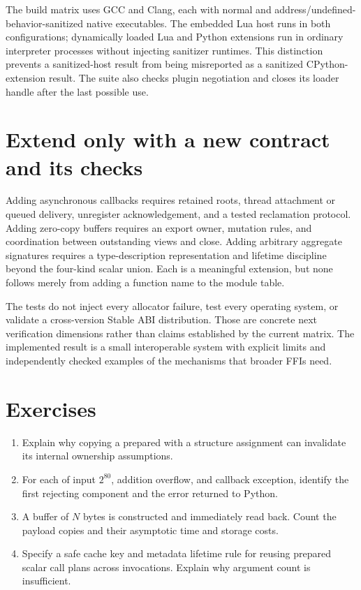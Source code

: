 The build matrix uses GCC and Clang, each with normal and address/undefined-behavior-sanitized native executables.
The embedded Lua host runs in both configurations; dynamically loaded Lua and Python extensions run in ordinary interpreter processes without injecting sanitizer runtimes.
This distinction prevents a sanitized-host result from being misreported as a sanitized CPython-extension result.
The suite also checks plugin negotiation and closes its loader handle after the last possible use.

\section{Extend only with a new contract and its checks}
\label{sec:ch76-extension}
Adding asynchronous callbacks requires retained roots, thread attachment or queued delivery, unregister acknowledgement, and a tested reclamation protocol.
Adding zero-copy buffers requires an export owner, mutation rules, and coordination between outstanding views and close.
Adding arbitrary aggregate signatures requires a type-description representation and lifetime discipline beyond the four-kind scalar union.
Each is a meaningful extension, but none follows merely from adding a function name to the module table.

The tests do not inject every allocator failure, test every operating system, or validate a cross-version Stable ABI distribution.
Those are concrete next verification dimensions rather than claims established by the current matrix.
The implemented result is a small interoperable system with explicit limits and independently checked examples of the mechanisms that broader FFIs need.

\section{Exercises}
\label{sec:ch76-exercises}
\begin{enumerate}
\item\label{ex:ch76-plan} Explain why copying a prepared  with a structure assignment can invalidate its internal ownership assumptions.
\item\label{ex:ch76-error} For each of input $2^{80}$, addition overflow, and callback exception, identify the first rejecting component and the error returned to Python.
\item\label{ex:ch76-cost} A buffer of $N$ bytes is constructed and immediately read back.
Count the payload copies and their asymptotic time and storage costs.
\item\label{ex:ch76-cache} Specify a safe cache key and metadata lifetime rule for reusing prepared scalar call plans across invocations.
Explain why argument count is insufficient.
\end{enumerate}

